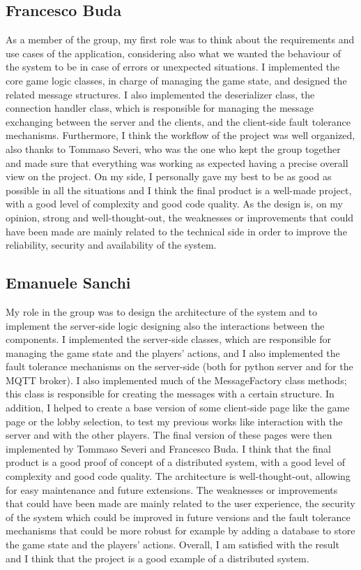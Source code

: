 \documentclass{scrartcl}
\begin{document}
\subsection{Francesco Buda}\label{francesco-buda}
As a member of the group, my first role was to think about the requirements and use cases of the application,
considering also what we wanted the behaviour of the system to be in case of errors or unexpected situations.
I implemented the core game logic classes, in charge of managing the game state, and designed the related 
message structures. I also implemented the deserializer class, the connection handler class, which is
responsible for managing the message exchanging between the server and the clients, and the client-side fault
tolerance mechanisms. Furthermore, I think the workflow of the project was well organized, also thanks to Tommaso Severi, who
was the one who kept the group together and made sure that everything was working as expected having a precise
overall view on the project. On my side, I personally gave my best to be as good as possible in all the situations
and I think the final product is a well-made project, with a good level of complexity and good code quality. 
As the design is, on my opinion, strong and well-thought-out, the weaknesses or improvements that could have been made are
mainly related to the technical side in order to improve the reliability, security and availability of the system.

\subsection{Emanuele Sanchi}\label{emanuele-sanchi}
My role in the group was to design the architecture of the system and to implement the server-side 
logic designing also the interactions between the components. I implemented the server-side classes, 
which are responsible for managing the game state and the players' actions, and I also implemented 
the fault tolerance mechanisms on the server-side (both for python server and for the MQTT broker). 
I also implemented much of the MessageFactory class methods; this class is responsible for creating 
the messages with a certain structure. In addition, I helped to create a base version of some 
client-side page like the game page or the lobby selection, to test my previous works like interaction 
with the server and with the other players. The final version of these pages were then implemented by 
Tommaso Severi and Francesco Buda. I think that the final product is a good proof of concept of a 
distributed system, with a good level of complexity and good code quality. The architecture is 
well-thought-out, allowing for easy maintenance and future extensions. The weaknesses or improvements 
that could have been made are mainly related to the user experience, the security of the system which 
could be improved in future versions and the fault tolerance mechanisms that could be more robust for 
example by adding a database to store the game state and the players' actions. Overall, I am satisfied 
with the result and I think that the project is a good example of a distributed system.
\end{document}
